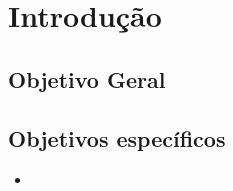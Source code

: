 \chapter{Introdução}
\label{capitulo:introducao}



\section{Objetivo Geral}


\section{Objetivos específicos}

\begin{itemize}
	\item 
\end{itemize}